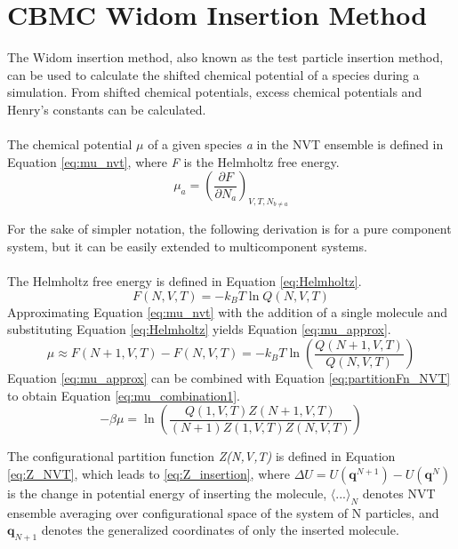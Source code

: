 \chapter{CBMC Widom Insertion Method}
\label{ch:widom_insertions}
The Widom insertion method, also known as the test particle insertion method, can be used to calculate the shifted chemical potential of a species during a simulation.  From shifted chemical potentials, excess chemical potentials and Henry's constants can be calculated. \\ \\
%
The chemical potential $\mu$ of a given species {\it a} in the NVT ensemble is defined in Equation \ref{eq:mu_nvt}, where {\it F} is the Helmholtz free energy.
\begin{equation}
    \label{eq:mu_nvt}
    \mu_a = {\left(\frac{\partial F}{\partial N_a}\right)}_{V,T,N_{b \neq a}}
\end{equation}

For the sake of simpler notation, the following derivation is for a pure component system, but it can be easily extended to multicomponent systems. \\ \\
%
The Helmholtz free energy is defined in Equation \ref{eq:Helmholtz}.
\begin{equation}
    \label{eq:Helmholtz}
    F(N,V,T) = -k_B T \ln{Q(N,V,T)}
\end{equation}
%
Approximating Equation \ref{eq:mu_nvt} with the addition of a single molecule and substituting Equation \ref{eq:Helmholtz} yields Equation \ref{eq:mu_approx}.
%
\begin{equation}
    \label{eq:mu_approx}
    \mu \approx F(N+1,V,T) - F(N,V,T) = -k_B T \ln{\left(\frac{Q(N+1,V,T)}{Q(N,V,T)}\right)}
\end{equation}
%
Equation \ref{eq:mu_approx} can be combined with Equation \ref{eq:partitionFn_NVT} to obtain Equation \ref{eq:mu_combination1}.
\begin{equation}
    \label{eq:mu_combination1}
    -\beta \mu = \ln{\left( \frac{Q(1,V,T) Z(N+1,V,T)}{(N+1) Z(1,V,T) Z(N,V,T)} \right)}
\end{equation}

The configurational partition function {\it Z(N,V,T)} is defined in Equation \ref{eq:Z_NVT}, which leads to \ref{eq:Z_insertion}, where $\Delta U = U(\mathbf{q}^{N+1}) - U(\mathbf{q}^N)$ is the change in potential energy of inserting the molecule, ${\langle ... \rangle}_N$ denotes NVT ensemble averaging over configurational space of the system of N particles, and $\mathbf{q}_{N+1}$ denotes the generalized coordinates of only the inserted molecule.

